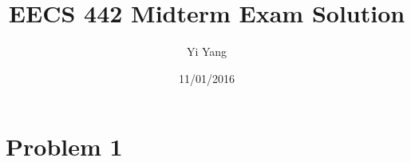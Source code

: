 \documentclass[letterpaper]{article}
\author{Yi Yang}
\title{EECS 442 Midterm Exam Solution}
\begin{document}
\date{11/01/2016}
\maketitle

\newcommand{\trace}{\mathrm{trace}}
\newcommand{\real}{\mathbb R}  %
\newcommand{\nat}{\mathbb N}   %
\newcommand{\cp}{\mathbb C}    %
\newcommand{\ds}{\displaystyle}
\newcommand{\mf}[2]{\frac{\ds #1}{\ds #2}}
\newcommand{\spanof}[1]{\textrm{span} \{ #1 \}}
\newcommand{\sol}[0]{\textbf{Solution: }}
\newcommand{\pf}[0]{\textbf{Proof:}}
\newcommand{\rme}[0]{\textrm{e}}
\newcommand{\Null}[1]{\textrm{Null}\{#1\}}
\parindent 0pt
\section*{Problem 1}
\end{document}
